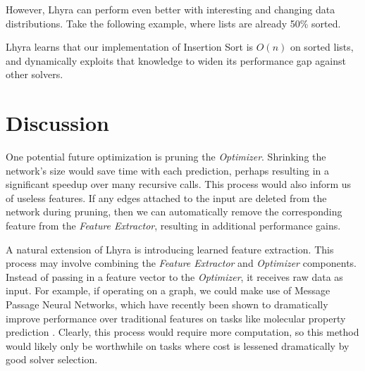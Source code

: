 \documentclass{article}
\begin{document}
However, Lhyra can perform even better with interesting and changing data distributions.  Take the following example, where lists are already 50\% sorted.

\vspace{0.5cm}
\begin{figure}[!ht]
    \centering
    \begin{floatrow}
      
    \end{floatrow}
\end{figure}

Lhyra learns that our implementation of Insertion Sort is $O(n)$ on sorted lists, and dynamically exploits that knowledge to widen its performance gap against other solvers.

\section{Discussion}

One potential future optimization is pruning the \textit{Optimizer}. Shrinking the network's size would save time with each prediction, perhaps resulting in a significant speedup over many recursive calls. This process would also inform us of useless features. If any edges attached to the input are deleted from the network during pruning, then we can automatically remove the corresponding feature from the \textit{Feature Extractor}, resulting in additional performance gains.

A natural extension of Lhyra is introducing learned feature extraction. This process may involve combining the \textit{Feature Extractor} and \textit{Optimizer} components. Instead of passing in a feature vector to the \textit{Optimizer}, it receives raw data as input. For example, if operating on a graph, we could make use of Message Passage Neural Networks, which have recently been shown to dramatically improve performance over traditional features on tasks like molecular property prediction \cite{GilmerSRVD17}. Clearly, this process would require more computation, so this method would likely only be worthwhile on tasks where cost is lessened dramatically by good solver selection.
\end{document}
